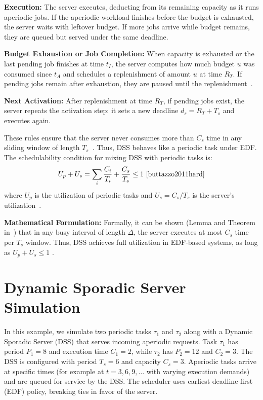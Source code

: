 \documentclass[conference]{IEEEtran}
\begin{document}
\textbf{Execution:} The server executes, deducting from its remaining capacity as it runs aperiodic jobs. 
If the aperiodic workload finishes before the budget is exhausted, the server waits with leftover budget. 
If more jobs arrive while budget remains, they are queued but served under the same deadline.


\textbf{Budget Exhaustion or Job Completion:} When capacity is exhausted or the last pending job finishes at time $t_I$, the server computes how much budget $u$ was consumed since $t_A$ and schedules a replenishment of amount $u$ at time $R_T$. 
If pending jobs remain after exhaustion, they are paused until the replenishment~\cite{spuri1994efficient}.

\textbf{Next Activation:} After replenishment at time $R_T$, if pending jobs exist, the server repeats the activation step: it sets a new deadline $d_s = R_T + T_s$ and executes again.

These rules ensure that the server never consumes more than $C_s$ time in any sliding window of length $T_s$~\cite{spuri1994efficient,buttazzo2011hard}. 
Thus, DSS behaves like a periodic task under EDF. The schedulability condition for mixing DSS with periodic tasks is:
\[
U_p + U_s = \sum_i \frac{C_i}{T_i} + \frac{C_s}{T_s} \leq 1
\ \cite{buttazzo2011hard} \]
where $U_p$ is the utilization of periodic tasks and $U_s = C_s/T_s$ is the server's utilization~\cite{buttazzo2011hard}.

\textbf{Mathematical Formulation:} Formally, it can be shown (Lemma and Theorem in~\cite{spuri1994efficient}) that in any busy interval of length $\Delta$, the server executes at most $C_s$ time per $T_s$ window. 
Thus, DSS achieves full utilization in EDF-based systems, as long as $U_p + U_s \leq 1$  \cite{buttazzo2011hard}.

\section{Dynamic Sporadic Server Simulation}
\label{sec:dss_Simulation}In this example, we simulate two periodic tasks $\tau_1$ and $\tau_2$ along with a Dynamic Sporadic Server (DSS) that serves incoming aperiodic requests. Task $\tau_1$ has period $P_1=8$ and execution time $C_1=2$, while $\tau_2$ has $P_2=12$ and $C_2=3$. The DSS is configured with period $T_s=6$ and capacity $C_s=3$. Aperiodic tasks arrive at specific times (for example at $t=3,6,9,\dots$ with varying execution demands) and are queued for service by the DSS. The scheduler uses earliest-deadline-first (EDF) policy, breaking ties in favor of the server\cite{buttazzo2011hard, cpen432}.
\end{document}
